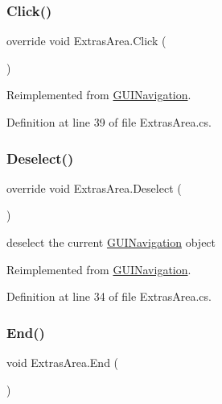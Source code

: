 \subsubsection{\texorpdfstring{Click()}{Click()}}
{\footnotesize\ttfamily override void Extras\+Area.\+Click (\begin{DoxyParamCaption}{ }\end{DoxyParamCaption})\hspace{0.3cm}{\ttfamily [virtual]}}



Reimplemented from \mbox{\hyperlink{class_g_u_i_navigation_a175178a8bf2832e74c13f83bf8e8f714}{G\+U\+I\+Navigation}}.



Definition at line 39 of file Extras\+Area.\+cs.

\mbox{\label{class_extras_area_adebb4c62e12d4a0fa6c89fa28a30b775}} 
\subsubsection{\texorpdfstring{Deselect()}{Deselect()}}
{\footnotesize\ttfamily override void Extras\+Area.\+Deselect (\begin{DoxyParamCaption}{ }\end{DoxyParamCaption})\hspace{0.3cm}{\ttfamily [virtual]}}



deselect the current \mbox{\hyperlink{class_g_u_i_navigation}{G\+U\+I\+Navigation}} object 



Reimplemented from \mbox{\hyperlink{class_g_u_i_navigation_a98563f06446b45814ff78978b472e948}{G\+U\+I\+Navigation}}.



Definition at line 34 of file Extras\+Area.\+cs.

\mbox{\label{class_extras_area_a25815ca0b4cd7c1ee7f202e510434298}} 
\subsubsection{\texorpdfstring{End()}{End()}}
{\footnotesize\ttfamily void Extras\+Area.\+End (\begin{DoxyParamCaption}{ }\end{DoxyParamCaption})}



